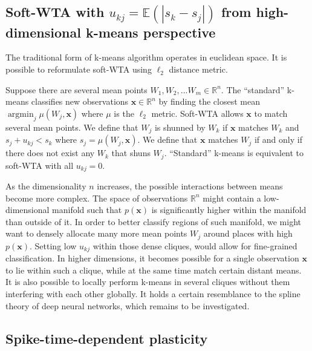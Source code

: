 \documentclass[oneside,english,logo]{amuthesis}
\DeclareMathOperator*{\argmin}{argmin}
\begin{document}
 

\subsection{Soft-WTA with $u_{kj}=\mathbb{E}(|s_k-s_j|)$ from high-dimensional k-means perspective}
The traditional form of k-means algorithm operates in euclidean space. It is possible to reformulate soft-WTA using $\ell_2$ distance metric. 

Suppose there are several mean points $W_1,W_2,...W_m\in \mathbb{R}^n$. The ``standard'' k-means classifies new observations $\boldsymbol{x}\in\mathbb{R}^n$ by finding the closest mean $\argmin_j \mu(W_j,\boldsymbol{x})$ where $\mu$ is the $\ell_2$ metric. Soft-WTA allows $\boldsymbol{x}$ to match several mean points. We define that $W_j$ is shunned by $W_k$ if $\boldsymbol{x}$ matches $W_k$ and $s_j + u_{kj} < s_k$ where $s_j=\mu(W_j,\boldsymbol{x})$. We define that $\boldsymbol{x}$ matches $W_j$ if and only if there does not exist any $W_k$ that shuns $W_j$. ``Standard'' k-means is equivalent to soft-WTA with all $u_{kj}=0$.

As the dimensionality $n$ increases, the possible interactions between means become more complex. The space of observations $\mathbb{R}^n$ might contain a low-dimensional manifold such that $p(\boldsymbol{x})$ is significantly higher within the manifold than outside of it. In order to better classify regions of such manifold, we might want to densely allocate many more mean points $W_j$ around places with high $p(\boldsymbol{x})$. Setting low $u_{kj}$ within those dense cliques,  would allow for fine-grained classification. In higher dimensions, it becomes possible for a single observation $\boldsymbol{x}$ to lie within such a clique, while at the same time match certain distant means. It is also possible to locally perform k-means in several cliques without them interfering with each other globally. It holds a certain resemblance to the spline theory of deep neural networks, which remains to be investigated.

\subsection{Spike-time-dependent plasticity} 
\end{document}
